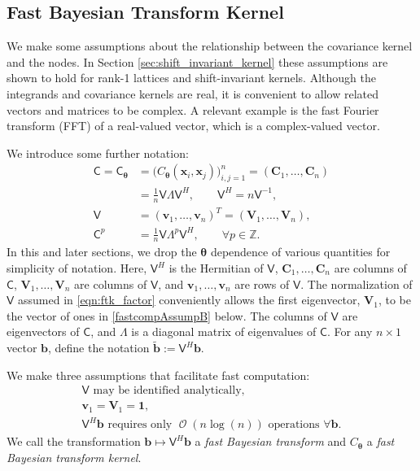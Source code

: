 \documentclass{svjour3}                     %
\DeclareMathOperator{\Order}{{\mathcal O}}
\newcommand{\bm}[1]{\boldsymbol{#1}}
\newcommand{\integers}{\mathbb{Z}}
\newcommand{\vtheta}{{\bm{\theta}}}
\newcommand{\vb}{\bm{b}}
\newcommand{\vC}{\bm{C}}
\newcommand{\vv}{\bm{v}}
\newcommand{\vV}{\bm{V}}
\newcommand{\vx}{\bm{x}}
\newcommand{\vone}{\bm{1}}
\newcommand{\mC}{\mathsf{C}}
\newcommand{\mLambda}{\mathsf{\Lambda}}
\newcommand{\mV}{\mathsf{V}}
\begin{document}
\subsection{Fast Bayesian Transform Kernel}
We make some assumptions about the relationship between the covariance kernel and the nodes.  In Section \ref{sec:shift_invariant_kernel} these assumptions are shown to hold  for rank-1 lattices and shift-invariant kernels.  Although the integrands and covariance kernels are real, it is convenient to allow related vectors and matrices to be complex.  A relevant example is the fast Fourier transform (FFT) of a real-valued vector, which is a complex-valued vector. 

We introduce some further notation:
\begin{align}
\nonumber
\mC = \mC_\vtheta &= \Big(C_\vtheta(\vx_i,\vx_j)\Big)_{i,j=1}^n  = (\vC_1,\dots,\vC_n) 
\\
\label{eqn:ftk_factor}
&= \frac 1n \mV \mLambda \mV^H , 
\quad \quad \mV^H = n \mV^{-1}, \\
\nonumber
\mV &= (\vv_1,\ldots,\vv_n)^T = (\vV_1,\ldots,\vV_n), \\
\nonumber
\mC^p  &= \frac 1n \mV \mLambda^{p} \mV^H, \qquad \forall p \in \integers.
\end{align}
In this and later sections, we drop the $\vtheta$ dependence of various quantities for simplicity of notation.  Here, $\mV^H$ is the Hermitian of $\mV$, $\vC_1,\dots,\vC_n$ are columns of $\mC$,  $\vV_1,\dots,\vV_n$ are columns of $\mV$, and $\vv_1,\dots,\vv_n$ are rows of $\mV$.  The normalization of $\mV$ assumed in \eqref{eqn:ftk_factor} conveniently allows the first eigenvector, $\vV_1$, to be the vector of ones in \eqref{fastcompAssumpB} below.  The columns of $\mV$ are eigenvectors of $\mC$, and $\mLambda$ is a diagonal matrix of eigenvalues of $\mC$.
For any $n \times 1$ vector $\vb$, define the notation  $\widetilde{\vb} := \mV^H \vb$.

We make three assumptions that facilitate  fast computation:
\begin{subequations} \label{fastcompAssump}
	\begin{gather}
	\label{fastcompAssumpA}
	\mV \text{ may be identified analytically}, \\
	\label{fastcompAssumpB}
	\vv_1 = \vV_1 = \vone, \\
	\label{fastcompAssumpC}
	\mV^H \vb  \text{ requires only $\Order(n \log(n))$ operations } \forall \vb.
	\end{gather}
\end{subequations}
We call the transformation $\vb \mapsto \mV^H \vb$ a \emph{fast Bayesian transform} and $C_\vtheta$ a \emph{fast Bayesian transform kernel}.  
\end{document}
